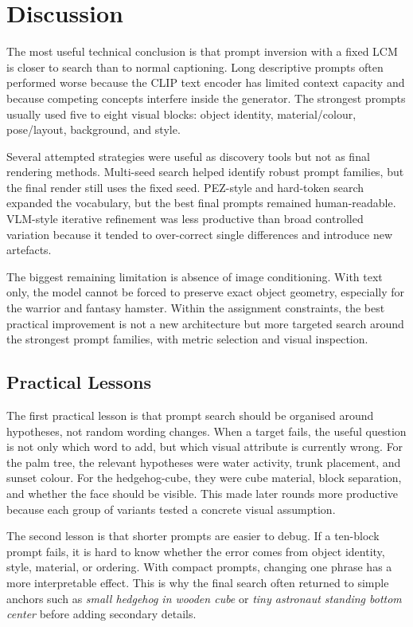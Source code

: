 \documentclass[runningheads]{llncs}
\begin{document}
\section{Discussion}

The most useful technical conclusion is that prompt inversion with a fixed LCM is closer to search than to normal captioning. Long descriptive prompts often performed worse because the CLIP text encoder has limited context capacity and because competing concepts interfere inside the generator. The strongest prompts usually used five to eight visual blocks: object identity, material/colour, pose/layout, background, and style.

Several attempted strategies were useful as discovery tools but not as final rendering methods. Multi-seed search helped identify robust prompt families, but the final render still uses the fixed seed. PEZ-style and hard-token search expanded the vocabulary, but the best final prompts remained human-readable. VLM-style iterative refinement was less productive than broad controlled variation because it tended to over-correct single differences and introduce new artefacts.

The biggest remaining limitation is absence of image conditioning. With text only, the model cannot be forced to preserve exact object geometry, especially for the warrior and fantasy hamster. Within the assignment constraints, the best practical improvement is not a new architecture but more targeted search around the strongest prompt families, with metric selection and visual inspection.

\subsection{Practical Lessons}

The first practical lesson is that prompt search should be organised around hypotheses, not random wording changes. When a target fails, the useful question is not only which word to add, but which visual attribute is currently wrong. For the palm tree, the relevant hypotheses were water activity, trunk placement, and sunset colour. For the hedgehog-cube, they were cube material, block separation, and whether the face should be visible. This made later rounds more productive because each group of variants tested a concrete visual assumption.

The second lesson is that shorter prompts are easier to debug. If a ten-block prompt fails, it is hard to know whether the error comes from object identity, style, material, or ordering. With compact prompts, changing one phrase has a more interpretable effect. This is why the final search often returned to simple anchors such as \emph{small hedgehog in wooden cube} or \emph{tiny astronaut standing bottom center} before adding secondary details.
\end{document}
